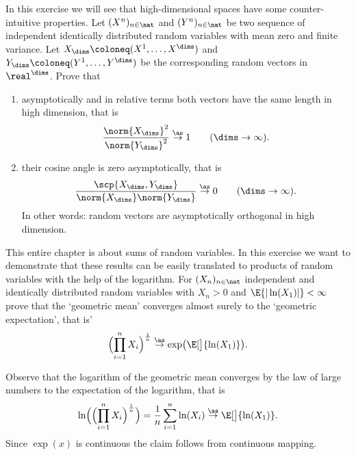 \begin{exercise}
    In this exercise we will see that high-dimensional spaces have some counter-intuitive
    properties. Let \((X^n)_{n\in \nat}\) and \((Y^n)_{n\in \nat}\) be two
    sequence of independent identically distributed random variables with mean
    zero and finite variance. Let \(X_\dims \coloneq (X^1, \ldots, X^\dims)\)
    and \(Y_\dims \coloneq (Y^1, \ldots, Y^\dims)\) be the corresponding random vectors in
    \(\real^\dims\).
    Prove that
    \begin{enumerate}[label=(\alph*), noitemsep]
        \item asymptotically and in relative terms both vectors have the same
        length in high dimension, that is
        \[
            \frac{\norm{X_\dims}^2}{\norm{Y_\dims}^2} \overset\as\to 1 \qquad (\dims \to \infty).
        \]
        \item their cosine angle is zero asymptotically, that is
        \[
            \frac{\scp{X_\dims, Y_\dims}}{\norm{X_\dims}\norm{Y_\dims}} \overset\as\to 0 \qquad (\dims \to \infty).
        \]
        In other words: random vectors are asymptotically orthogonal in high dimension.
    \end{enumerate}
\end{exercise}

\begin{exercise}
    This entire chapter is about sums of random variables. In this exercise we want
    to demonstrate that these results can be easily translated to products of
    random variables with the help of the logarithm. For
    \((X_n)_{n\in \nat}\) independent and identically distributed random variables
    with \(X_n > 0\) and \(\E{|\ln(X_1)|} < \infty\) prove that the
    `geometric mean' converges almost surely to the `geometric expectation',
    that is'
    \[
        \Bigl(\prod_{i=1}^n X_i \Bigr)^\frac1n
        \overset{\as}\to \exp\bigl(\E[\big]{\ln(X_1)}\bigr).
    \]

    \begin{solution}
        Observe that the logarithm of the geometric mean converges by the law of
        large numbers to the expectation of the logarithm, that is
        \[
            \ln\Bigl(\Bigl(\prod_{i=1}^n X_i \Bigr)^\frac1n\Bigr)
            = \frac1n \sum_{i=1}^n \ln(X_i)
            \overset{\as}\to \E[\big]{\ln(X_1)}.
        \]
        Since \(\exp(x)\) is continuous the claim follows from continuous mapping.
    \end{solution}

\end{exercise}

